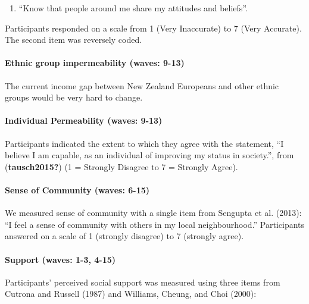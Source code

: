 \documentclass[
  letterpaper,
  DIV=11,
  numbers=noendperiod]{scrartcl}
\let\oldparagraph\paragraph
\renewcommand{\paragraph}[1]{\oldparagraph{#1}\mbox{}}
\providecommand{\tightlist}{%
  \setlength{\itemsep}{0pt}\setlength{\parskip}{0pt}}\usepackage{longtable,booktabs,array}
\begin{document}
\begin{enumerate}
\def\labelenumi{\arabic{enumi}.}
\setcounter{enumi}{2}
\tightlist
\item
  ``Know that people around me share my attitudes and beliefs''.
\end{enumerate}

Participants responded on a scale from 1 (Very Inaccurate) to 7 (Very
Accurate). The second item was reversely coded.

\hypertarget{ethnic-group-impermeability-waves-9-13}{%
\paragraph{Ethnic group impermeability (waves:
9-13)}\label{ethnic-group-impermeability-waves-9-13}}

The current income gap between New Zealand Europeans and other ethnic
groups would be very hard to change.

\hypertarget{individual-permeability-waves-9-13}{%
\paragraph{Individual Permeability (waves:
9-13)}\label{individual-permeability-waves-9-13}}

Participants indicated the extent to which they agree with the
statement, ``I believe I am capable, as an individual of improving my
status in society.'', from (\textbf{tausch2015?}) (1 = Strongly Disagree
to 7 = Strongly Agree).

\hypertarget{sense-of-community-waves-6-15}{%
\paragraph{Sense of Community (waves:
6-15)}\label{sense-of-community-waves-6-15}}

We measured sense of community with a single item from Sengupta et al.
(2013): ``I feel a sense of community with others in my local
neighbourhood.'' Participants answered on a scale of 1 (strongly
disagree) to 7 (strongly agree).

\hypertarget{support-waves-1-3-4-15}{%
\paragraph{Support (waves: 1-3, 4-15)}\label{support-waves-1-3-4-15}}

Participants' perceived social support was measured using three items
from Cutrona and Russell (1987) and Williams, Cheung, and Choi (2000):
\end{document}
